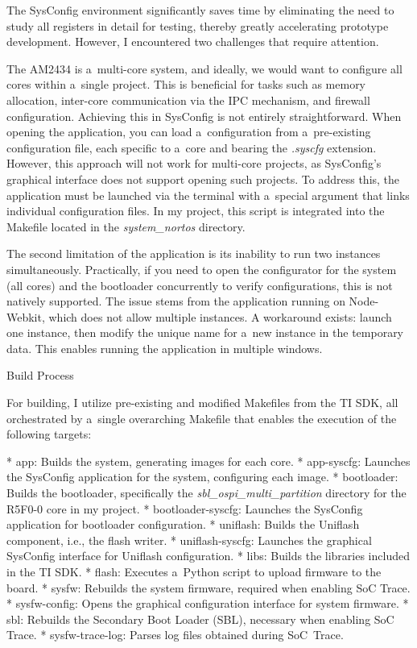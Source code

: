 The SysConfig environment significantly saves time by eliminating the need to study all registers in detail for testing, thereby greatly accelerating prototype development. However, I encountered two challenges that require attention.

The AM2434 is a~multi-core system, and ideally, we would want to configure all cores within a~single project. This is beneficial for tasks such as memory allocation, inter-core communication via the IPC mechanism, and firewall configuration. Achieving this in SysConfig is not entirely straightforward. When opening the application, you can load a~configuration from a~pre-existing configuration file, each specific to a~core and bearing the {\it .syscfg} extension. However, this approach will not work for multi-core projects, as SysConfig’s graphical interface does not support opening such projects. To address this, the application must be launched via the terminal with a~special argument that links individual configuration files. In my project, this script is integrated into the Makefile located in the {\it system_nortos} directory.

The second limitation of the application is its inability to run two instances simultaneously. Practically, if you need to open the configurator for the system (all cores) and the bootloader concurrently to verify configurations, this is not natively supported. The issue stems from the application running on Node-Webkit, which does not allow multiple instances. A workaround exists: launch one instance, then modify the unique name for a~new instance in the temporary data. This enables running the application in multiple windows.

\secc Build Process

For building, I utilize pre-existing and modified Makefiles from the TI SDK, all orchestrated by a~single overarching Makefile that enables the execution of the following targets:

\begitems
* {\sbf app}: Builds the system, generating images for each core.
* {\sbf app-syscfg}: Launches the SysConfig application for the system, configuring each image.
* {\sbf bootloader}: Builds the bootloader, specifically the {\it sbl_ospi_multi_partition} directory for the R5F0-0 core in my project.
* {\sbf bootloader-syscfg}: Launches the SysConfig application for bootloader configuration.
* {\sbf uniflash}: Builds the Uniflash component, i.e., the flash writer.
* {\sbf uniflash-syscfg}: Launches the graphical SysConfig interface for Uniflash configuration.
* {\sbf libs}: Builds the libraries included in the TI SDK.
* {\sbf flash}: Executes a~Python script to upload firmware to the board.
* {\sbf sysfw}: Rebuilds the system firmware, required when enabling SoC Trace.
* {\sbf sysfw-config}: Opens the graphical configuration interface for system firmware.
* {\sbf sbl}: Rebuilds the Secondary Boot Loader (SBL), necessary when enabling SoC Trace.
* {\sbf sysfw-trace-log}: Parses log files obtained during SoC~Trace.
\enditems

